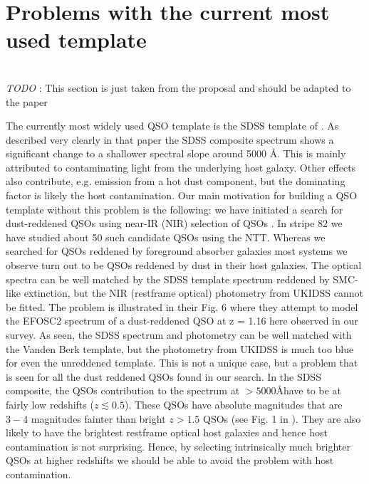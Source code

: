 \documentclass{aa}    %
\newcommand{\sectlabel}[1]{\label{sect:#1}}
\newcommand{\todo}[3]{{\color{#2}\emph{#1}: #3}}
\newcommand{\jstodo}[1]{\todo{ \\TODO }{green}{#1}}
\begin{document}
\section{Problems with the current most used template}   \sectlabel{problem}

\jstodo{This section is just taken from the proposal and should be adapted to the paper}


The currently most widely used QSO template is the SDSS template of \citep{VandenBerk2001}. As described very clearly in that paper the SDSS composite spectrum shows a significant change to a shallower spectral slope around 5000 \r{A}. This is mainly attributed to contaminating light from the underlying host galaxy. Other effects also contribute, e.g. emission from a hot dust component, but the dominating factor is likely the host contamination. Our main motivation for building a QSO template without this problem is the following: we have initiated a search for dust-reddened QSOs using near-IR (NIR) selection of QSOs \citep{Fynbo2013}. In stripe 82 we have studied about 50 such candidate QSOs using the NTT. Whereas we searched for QSOs reddened by foreground absorber galaxies most systems we observe turn out to be QSOs reddened by dust in their host galaxies. The optical spectra can be well matched by the SDSS template spectrum reddened by SMC-like extinction, but the NIR (restframe optical) photometry from UKIDSS cannot be fitted. The problem is illustrated in their Fig. 6 where they attempt to model the EFOSC2 spectrum of a dust-reddened QSO at z = 1.16 here observed in our survey. As seen, the SDSS spectrum and photometry can be well matched with the Vanden Berk template, but the photometry from UKIDSS is much too blue for even the unreddened template. This is not a unique case, but a problem that is seen for all the dust reddened QSOs found in our search.
In the SDSS composite, the QSOs contribution to the spectrum at $ > 5000$\AA have to be at fairly low redshifts ($z \lesssim  0.5$). These QSOs have absolute magnitudes that are $3-4$ magnitudes fainter than bright $z > 1.5$ QSOs (see Fig. 1 in  \cite{VandenBerk2001}). They are also likely to have the brightest restframe optical host galaxies and hence host contamination is not surprising. Hence, by selecting intrinsically much brighter QSOs at higher redshifts we should be able to avoid the problem with host contamination.
\end{document}
